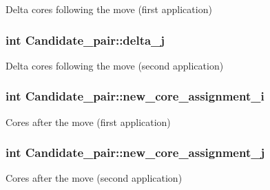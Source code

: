 Delta cores following the move (first application) 

\hypertarget{classCandidate__pair_a65cec47eee407768393199d82f1eebe4}{
\subsubsection[{delta\-\_\-j}]{\setlength{\rightskip}{0pt plus 5cm}int Candidate\-\_\-pair\-::delta\-\_\-j\hspace{0.3cm}{\ttfamily [private]}}}\label{classCandidate__pair_a65cec47eee407768393199d82f1eebe4}


Delta cores following the move (second application) 

\hypertarget{classCandidate__pair_a8ede26b1a4d583b2b9ac360612c789bf}{
\subsubsection[{new\-\_\-core\-\_\-assignment\-\_\-i}]{\setlength{\rightskip}{0pt plus 5cm}int Candidate\-\_\-pair\-::new\-\_\-core\-\_\-assignment\-\_\-i\hspace{0.3cm}{\ttfamily [private]}}}\label{classCandidate__pair_a8ede26b1a4d583b2b9ac360612c789bf}


Cores after the move (first application) 

\hypertarget{classCandidate__pair_ab4d273d1e72ae26d5230f4d783ef745b}{
\subsubsection[{new\-\_\-core\-\_\-assignment\-\_\-j}]{\setlength{\rightskip}{0pt plus 5cm}int Candidate\-\_\-pair\-::new\-\_\-core\-\_\-assignment\-\_\-j\hspace{0.3cm}{\ttfamily [private]}}}\label{classCandidate__pair_ab4d273d1e72ae26d5230f4d783ef745b}


Cores after the move (second application) 

